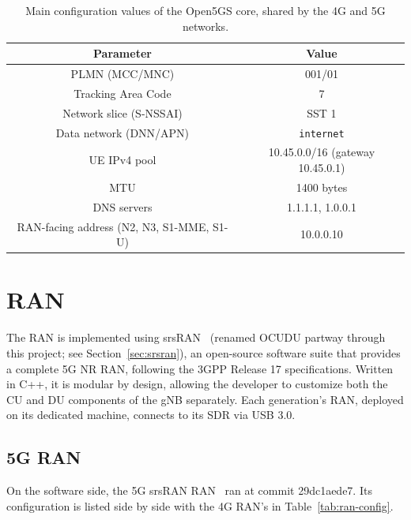 \begin{table}[htbp]
    \centering
    \begin{tabular}{|c|c|}
        \hline
        \textbf{Parameter} & \textbf{Value} \\
        \hline
        \gls{PLMN} (MCC/MNC) & 001/01 \\
        \hline
        Tracking Area Code & 7 \\
        \hline
        Network slice (S-NSSAI) & SST 1 \\
        \hline
        Data network (DNN/APN) & \texttt{internet} \\
        \hline
        \gls{UE} IPv4 pool & 10.45.0.0/16 (gateway 10.45.0.1) \\
        \hline
        MTU & 1400 bytes \\
        \hline
        DNS servers & 1.1.1.1, 1.0.0.1 \\
        \hline
        \gls{RAN}-facing address (N2, N3, S1-MME, S1-U) & 10.0.0.10 \\
        \hline
    \end{tabular}
    \caption[Main configuration values of the Open5GS core.]{Main configuration values of the Open5GS core, shared by the 4G and 5G networks.}
    \label{tab:core-config}
\end{table}

\section{\gls{RAN}}
\label{sec:ran}

The \gls{RAN} is implemented using srsRAN~\cite{ocudu_project} (renamed OCUDU partway through this project; see Section~\ref{sec:srsran}), an open-source software suite that provides a complete 5G \gls{NR} \gls{RAN}, following the \gls{3GPP} Release 17 specifications. Written in C++, it is modular by design, allowing the developer to customize both the \gls{CU} and \gls{DU} components of the \gls{gNB} separately. Each generation's \gls{RAN}, deployed on its dedicated machine, connects to its \gls{SDR} via USB 3.0.

\subsection{5G RAN}
\label{sec:ran-5g}

On the software side, the 5G srsRAN \gls{RAN}~\cite{ocudu_project} ran at commit 29dc1aede7. Its configuration is listed side by side with the 4G \gls{RAN}'s in Table~\ref{tab:ran-config}.

